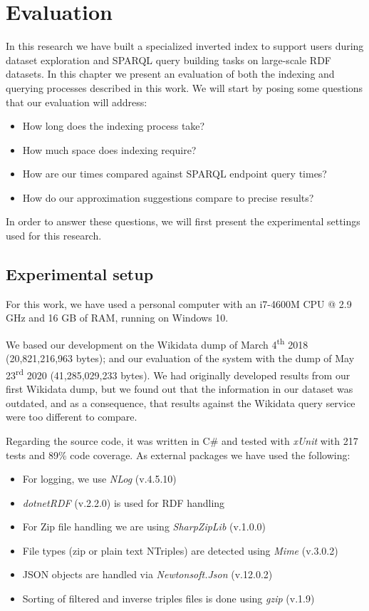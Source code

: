 \chapter{Evaluation}
\label{chap:evaluation}

In this research we have built a specialized inverted index to support users during dataset exploration and SPARQL query building tasks on large-scale RDF datasets. In this chapter we present an evaluation of both the indexing and querying processes described in this work. We will start by posing some questions that our evaluation will address:

\begin{itemize}
    \item How long does the indexing process take?
    \item How much space does indexing require?
    \item How are our times compared against SPARQL endpoint query times?
    \item How do our approximation suggestions compare to precise results?
\end{itemize}

In order to answer these questions, we will first present the experimental settings used for this research.

\section{Experimental setup}

For this work, we have used a personal computer with an i7-4600M CPU @ 2.9 GHz and 16 GB of RAM, running on Windows 10.

We based our development on the Wikidata dump of March 4\textsuperscript{th} 2018 (20,821,216,963 bytes); and our evaluation of the system with the dump of May 23\textsuperscript{rd} 2020 (41,285,029,233 bytes). We had originally developed results from our first Wikidata dump, but we found out that the information in our dataset was outdated, and as a consequence, that results against the Wikidata query service were too different to compare.

Regarding the source code, it was written in C\# and tested with \textit{xUnit} with 217 tests and 89\% code coverage. As external packages we have used the following:
\begin{itemize}
    \item For logging, we use \textit{NLog} (v.4.5.10)
    \item \textit{dotnetRDF} (v.2.2.0) is used for RDF handling
    \item For Zip file handling we are using \textit{SharpZipLib} (v.1.0.0)
    \item File types (zip or plain text NTriples) are detected using \textit{Mime} (v.3.0.2)
    \item JSON objects are handled via \textit{Newtonsoft.Json} (v.12.0.2)
    \item Sorting of filtered and inverse triples files is done using \textit{gzip} (v.1.9)
\end{itemize}


